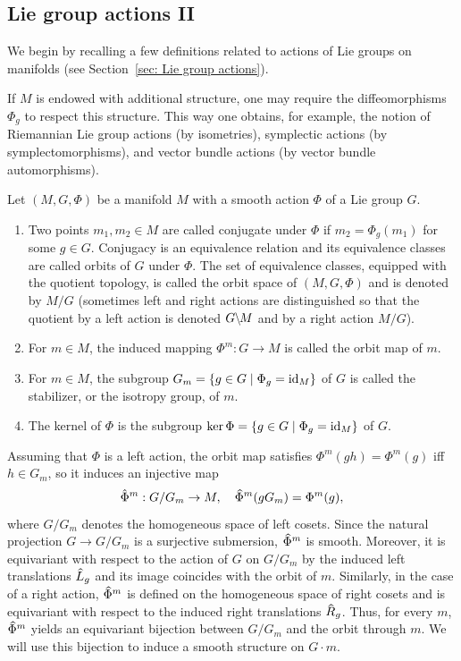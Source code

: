 \subsection{Lie group actions II}

We begin by recalling a few definitions related to actions of Lie groups on manifolds (see Section~\ref{sec: Lie group actions}).


\begin{rem}
    If $M$ is endowed with additional structure, one may require the diffeomorphisms $\Phi_g$ to respect this structure. This way one obtains, for example, the notion of Riemannian Lie group actions (by isometries), symplectic actions (by symplectomorphisms), and vector bundle actions (by vector bundle automorphisms).
\end{rem}


\begin{defn}
    Let $(M,G,\Phi)$ be a manifold $M$ with a smooth action $\Phi$ of a Lie group $G$. 
    \begin{enumerate}
        \item Two points $m_1,m_2\in M$ are called conjugate under $\Phi$ if $m_2=\Phi_g(m_1)$ for some $g\in G$. Conjugacy is an equivalence relation and its equivalence classes are called orbits of $G$ under $\Phi$. The set of equivalence classes, equipped with the quotient topology, is called the orbit space of $(M,G,\Phi)$ and is denoted by $M\slash G$ (sometimes left and right actions are distinguished so that the quotient by a left action is denoted $G\mkern-.5mu\backslash\mkern-2mu M$ and by a right action $M\slash G$).
        \item For $m\in M$, the induced mapping $\Phi^m:G\to M$ is called the orbit map of $m$.
        \item For $m\in M$, the subgroup $G_m=\{g\in G\mid \Phi_g=\operatorname{id}_M\}$ of $G$ is called the stabilizer, or the isotropy group, of $m$.
        \item The kernel of $\Phi$ is the subgroup $\ker\Phi=\{g\in G\mid \Phi_g=\operatorname{id}_M\}$ of $G$.
    \end{enumerate}
\end{defn}

Assuming that $\Phi$ is a left action, the orbit map satisfies $\Phi^m(gh)=\Phi^m(g)$ iff $h\in G_m$, so it induces an injective map
\[\hat{\Phi}^m:G\slash G_m\to M,\quad \wh{\Phi}^m(g G_m)=\Phi^m(g),\label{eq 6.1.8 RS1}\]
where $G\slash G_m$ denotes the homogeneous space of left cosets. Since the natural projection $G\to G\slash G_m$ is a surjective submersion, $\wh{\Phi}^m$ is smooth. Moreover, it is equivariant with respect to the action of $G$ on $G\slash G_m$ by the induced left translations $\wh{L}_g$ and its image coincides with the orbit of $m$. Similarly, in the case of a right action, $\wh{\Phi}^m$ is defined on the homogeneous space of right cosets and is equivariant with respect to the induced right translations $\wh{R}_g$. Thus, for every $m$, $\wh{\Phi}^m$ yields an equivariant bijection between $G\slash G_m$ and the orbit through $m$. We will use this bijection to induce a smooth structure on $G\cdot m$.


